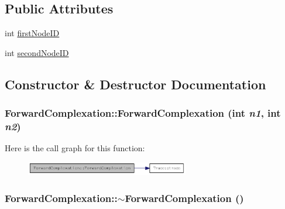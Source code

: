 \subsection*{Public Attributes}
\begin{DoxyCompactItemize}
\item 
int \hyperlink{classForwardComplexation_ab8992a599d764810b7be577f88ee791c}{firstNodeID}
\item 
int \hyperlink{classForwardComplexation_a48ebe46e9ee3b749165649d8b14c33fc}{secondNodeID}
\end{DoxyCompactItemize}


\subsection{Constructor \& Destructor Documentation}
\hypertarget{classForwardComplexation_a0ab16d0c2ad4bef757d811d4b7fd9682}{
\subsubsection[{ForwardComplexation}]{\setlength{\rightskip}{0pt plus 5cm}ForwardComplexation::ForwardComplexation (int {\em n1}, \/  int {\em n2})}}
\label{classForwardComplexation_a0ab16d0c2ad4bef757d811d4b7fd9682}


Here is the call graph for this function:\nopagebreak
\begin{figure}[H]
\begin{center}
\leavevmode
\includegraphics[width=202pt]{classForwardComplexation_a0ab16d0c2ad4bef757d811d4b7fd9682_cgraph}
\end{center}
\end{figure}
\hypertarget{classForwardComplexation_afd5c904c0ae1842caa2e26162300d2ff}{
\subsubsection[{$\sim$ForwardComplexation}]{\setlength{\rightskip}{0pt plus 5cm}ForwardComplexation::$\sim$ForwardComplexation ()}}
\label{classForwardComplexation_afd5c904c0ae1842caa2e26162300d2ff}



